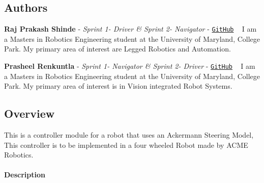 \href{https://travis-ci.org/RajPShinde/Robot_Controller_Module}{\tt } \href{https://coveralls.io/github/RajPShinde/Robot_Controller_Module?branch=GMock_Extra_Credit}{\tt } \href{https://github.com/RajPShinde/Robot_Controller_Module/blob/master/LICENSE}{\tt } \subsection*{\href{https://github.com/RajPShinde/Robot_Controller_Module/tree/master/docs}{\tt } }

\subsection*{Authors}


\begin{DoxyItemize}
\item {\bfseries Raj Prakash Shinde} -\/ {\itshape Sprint 1-\/ Driver \& Sprint 2-\/ Navigator} -\/ \href{https://github.com/RajPShinde}{\tt Git\+Hub} ~\newline
I am a Masters in Robotics Engineering student at the University of Maryland, College Park. My primary area of interest are Legged Robotics and Automation.
\item {\bfseries Prasheel Renkuntla} -\/ {\itshape Sprint 1-\/ Navigator \& Sprint 2-\/ Driver} -\/ \href{https://github.com/Prasheel24}{\tt Git\+Hub} ~\newline
I am a Master\textquotesingle{}s in Robotics Engineering student at the University of Maryland, College Park. My primary area of interest is in Vision integrated Robot Systems.
\end{DoxyItemize}

\subsection*{Overview}

This is a controller module for a robot that uses an Ackermann Steering Model, This controller is to be implemented in a four wheeled Robot made by A\+C\+ME Robotics.

\paragraph*{Description}

